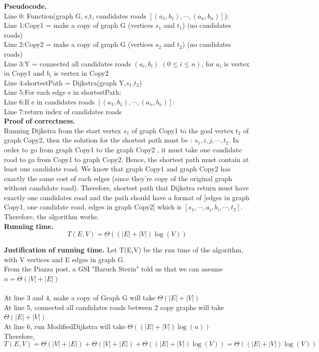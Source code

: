 \documentclass[11pt]{article}
\newcommand{\tab}{\hspace*{2em}}
\begin{document}
\noindent
\textbf{Pseudocode.}\\
Line 0: Function(graph G, s,t, candidates roads $[(a_1,b_1),\cdots,(a_n,b_n)]$):\\
Line 1:\tab Copy1 = make a copy of graph G (vertices $s_1$ and $t_1$) (no candidates roads) \\
Line 2:\tab Copy2 = make a copy of graph G (vertices $s_2$ and $t_2$) (no candidates roads)\\
Line 3:\tab Y = connected all candidates roads $(a_i,b_i)$ $( 0\leqslant i\leqslant n)$, for $a_i$ is vertex in Copy1 and $b_i$ is vertex in Copy2\\
Line 4:\tab shortestPath = Dijkstra(graph Y,$s_1$,$t_2$)\\
Line 5:\tab For each edge e in shortestPath:\\
Line 6:\tab\tab If e in candidates roads $[(a_1,b_1),\cdots,(a_n,b_n)]$:\\
Line 7:\tab\tab\tab return index of candidates roads\\

\noindent
\textbf{Proof of correctness.}\\
Running Dijkstra from the start vertex $s_1$ of graph Copy1 to the goal vertex $t_2$ of graph Copy2, then the solution for the shortest path must be : $s_1, i, j,\cdots, t_2$. In order to go from graph Copy1 to the graph Copy2 , it must take one candidate road to go from Copy1 to graph Copy2. Hence, the shortest path must contain at least one candidate road. We know that graph Copy1 and graph Copy2 has exactly the same cost of each edges (since they're copy of the original graph without candidate road). Therefore, shortest path that Dijkstra return must have exactly one candidates road and the path should have a format of [edges in graph Copy1, one candidate road, edges in graph Copy2] which is $[s_1,\cdots, a_i,b_i, \cdots, t_2]$. Therefore, the algorithm works.\\

\noindent
\textbf{Running time.}
$$\boxed{T(E,V) = \Theta((|E| + |V|)\log(V))}$$

\noindent
\textbf{Justification of running time.}
Let T(E,V) be the run time of the algorithm, with V vertices and E edges in graph G.\\
From the Piazza post, a GSI "Baruch Sterin" told us that we can assume $n = \Theta(|V| + |E|)$\\
\\
At line 3 and 4, make a copy of Graph G will take $\Theta(|E| + |V|)$\\
At line 5, connected all candidates roads between 2 copy graphs will take $\Theta(|E| + |V|)$\\
At line 6, run ModifiedDijkstra will take $\Theta((|E| + |V|)\log(n))$\\
Therefore,
$$T(E,V) = \Theta(|V| + |E|) + \Theta(|V| + |E|) + \Theta((|E| + |V|)\log(V)) = \Theta((|E| + |V|)\log(V))$$ 
\end{document}
